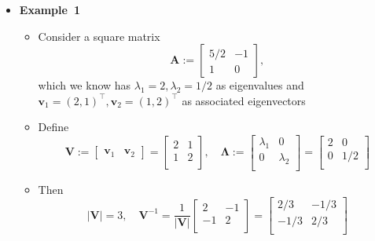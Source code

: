\documentclass[12pt,a4paper]{article}
\begin{document}
\begin{itemize}

\item \textbf{Example~1}
  \begin{itemize}
  \item Consider a square matrix
    \begin{equation}\nonumber%
      \bm{A} :=
      \begin{bmatrix}
        5/2 & -1 \\
        1 & 0
      \end{bmatrix},
    \end{equation}
    which we know has $\lambda_{1}=2, \lambda_{2}=1/2$ as eigenvalues
    and $\bm{v}_{1}=(2, 1)^{\top}, \bm{v}_{2}=(1, 2)^{\top}$ as associated eigenvectors
  \item Define
    \begin{equation}\nonumber%
      \bm{V}:=
      \begin{bmatrix}
        \bm{v}_{1} & \bm{v}_{2}
      \end{bmatrix}
      =
      \begin{bmatrix}
        2 & 1 \\
        1 & 2 \\
      \end{bmatrix},
      \quad
      \bm{\Lambda}:=
      \begin{bmatrix}
        \lambda_{1} & 0 \\
        0 & \lambda_{2} \\
      \end{bmatrix}
      =
      \begin{bmatrix}
        2 & 0 \\
        0 & 1/2 \\
      \end{bmatrix}
    \end{equation}
  \item Then
    \begin{equation}\nonumber%
      |\bm{V}| = 3,
      \quad
      \bm{V}^{-1}
      = \frac{1}{|\bm{V}|}
      \begin{bmatrix}
        2 & -1 \\
        -1 & 2 \\
      \end{bmatrix}
      =
      \begin{bmatrix}
        2/3 & -1/3 \\
        -1/3 & 2/3 \\
      \end{bmatrix}

\end{equation}
\end{itemize}
\end{itemize}
\end{document}
